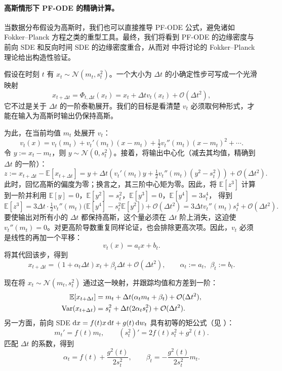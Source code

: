 \paragraph{高斯情形下 PF-ODE 的精确计算。}
当数据分布假设为高斯时，我们也可以直接推导 PF-ODE 公式，避免诸如 Fokker–Planck 方程之类的重型工具。最终，我们将看到 PF-ODE 的边缘密度与前向 SDE 和反向时间 SDE 的边缘密度重合，从而对  中将讨论的 Fokker–Planck 理论给出构造性验证。


假设在时刻 $t$ 有 $x_t\sim\mathcal N(m_t,s_t^2)$。一个大小为 $\Delta t$ 的小确定性步可写成一个光滑映射
\[
x_{t+\Delta t}=\Phi_{t,\Delta t}(x_t)
= x_t + \Delta t v_t(x_t) + \mathcal{O}(\Delta t^2),
\]
它不过是关于 $\Delta t$ 的一阶泰勒展开。我们的目标是看清楚 $v_t$ 必须取何种形式，才能在输入为高斯时输出仍保持高斯。

为此，在当前均值 $m_t$ 处展开 $v_t$：
\[
v_t(x)=v_t(m_t)+v_t'(m_t)(x-m_t)+\tfrac12 v_t''(m_t)(x-m_t)^2+\cdots.
\]
令 $y:=x_t-m_t$，则 $y\sim\mathcal N(0,s_t^2)$。接着，将输出中心化（减去其均值，精确到 $\Delta t$ 的一阶）：
\[
z:=x_{t+\Delta t}-\mathbb E[x_{t+\Delta t}]
= y + \Delta t\!\left(v_t'(m_t) y+\tfrac12 v_t''(m_t) (y^2-s_t^2)\right)+\mathcal{O}(\Delta t^2).
\]
此时，回忆高斯的偏度为零；换言之，其三阶中心矩为零。因此，将 $\mathbb E[z^3]$ 计算到一阶并利用
$\mathbb E[y]=0$，$\mathbb E[y^2]=s_t^2$，$\mathbb E[y^3]=0$，$\mathbb E[y^4]=3s_t^4$，
得到
\[
\mathbb E[z^3]
= 3 \Delta t\cdot \tfrac12 v_t''(m_t) \big(\mathbb E[y^4]-s_t^2\mathbb E[y^2]\big)+\mathcal{O}(\Delta t^2)
= 3 \Delta t v_t''(m_t) s_t^4+\mathcal{O}(\Delta t^2).
\]
要使输出对所有小的 $\Delta t$ 都保持高斯，这个量必须在 $\Delta t$ 阶上消失，这迫使 $v_t''(m_t)=0$。对更高阶导数重复同样论证，也会排除更高次项。因此，$v_t$ 必须是线性的再加一个平移：
\[
v_t(x)=a_t x+b_t.
\]
将其代回该步，得到
\[
x_{t+\Delta t}=(1+\alpha_t \Delta t) x_t+\beta_t \Delta t+\mathcal{O}(\Delta t^2),
\qquad
\alpha_t:=a_t,\ \ \beta_t:=b_t.
\]

现在将 $x_t\sim\mathcal N(m_t,s_t^2)$ 通过这一映射，并跟踪均值和方差到一阶：
\begin{align*}
\mathbb E[x_{t+\Delta t}]
&= m_t+\Delta t(\alpha_t m_t+\beta_t)+\mathcal{O}(\Delta t^2),
\\
\mathrm{Var}(x_{t+\Delta t})
&= s_t^2+\Delta t (2\alpha_t s_t^2)+\mathcal{O}(\Delta t^2).
\end{align*}
另一方面，前向 SDE $\mathop{}\!\mathrm{d} x=f(t) x \mathop{}\!\mathrm{d} t+g(t) \mathop{}\!\mathrm{d} w_t$ 具有初等的矩公式（见 ）：
\[
m_t' = f(t) m_t,
\qquad
(s_t^2)' = 2 f(t) s_t^2 + g^2(t).
\]
匹配 $\Delta t$ 的系数，得到
\[
\alpha_t = f(t)+\frac{g^2(t)}{2 s_t^2},
\qquad
\beta_t = - \frac{g^2(t)}{2 s_t^2} m_t.
\]

